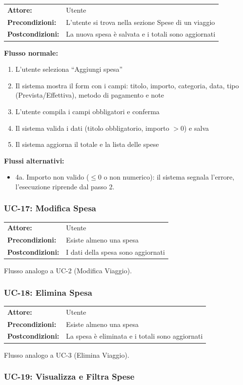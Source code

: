 \documentclass[12pt, a4paper]{article}
\makeatletter
\newcommand{\ucblock}[3]{%
  \noindent
  \begin{tabular}{@{}ll@{}}
    \textbf{Attore:}         & #1 \\
    \textbf{Precondizioni:}  & #2 \\
    \textbf{Postcondizioni:} & #3 \\
  \end{tabular}%
  \medskip
}
\makeatother
\begin{document}
\ucblock{Utente}{L'utente si trova nella sezione Spese di un viaggio}{La nuova spesa è salvata e i totali sono aggiornati}

\noindent\textbf{Flusso normale:}
\begin{enumerate}[leftmargin=1.5em, itemsep=1pt]
  \item L'utente seleziona ``Aggiungi spesa''
  \item Il sistema mostra il form con i campi: titolo, importo, categoria, data,
    tipo (Prevista/Effettiva), metodo di pagamento e note
  \item L'utente compila i campi obbligatori e conferma
  \item Il sistema valida i dati (titolo obbligatorio, importo \(> 0\)) e salva
  \item Il sistema aggiorna il totale e la lista delle spese
\end{enumerate}

\noindent\textbf{Flussi alternativi:}
\begin{itemize}[leftmargin=1.5em, itemsep=1pt]
  \item 4a. Importo non valido (\(\leq 0\) o non numerico): il sistema segnala l'errore,
    l'esecuzione riprende dal passo 2.
\end{itemize}

\subsubsection{UC-17: Modifica Spesa}

\ucblock{Utente}{Esiste almeno una spesa}{I dati della spesa sono aggiornati}

\noindent Flusso analogo a UC-2 (Modifica Viaggio).

\subsubsection{UC-18: Elimina Spesa}

\ucblock{Utente}{Esiste almeno una spesa}{La spesa è eliminata e i totali sono aggiornati}

\noindent Flusso analogo a UC-3 (Elimina Viaggio).

\subsubsection{UC-19: Visualizza e Filtra Spese}
\end{document}
